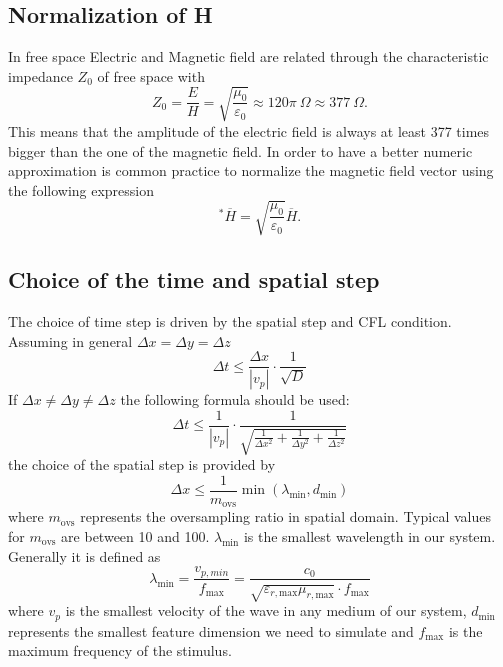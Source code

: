 \subsection{Normalization of H}
In free space Electric and Magnetic field are related through the characteristic impedance $Z_0$ of free space with
\begin{equation*}
	Z_0 = \frac{E}{H}=\sqrt{\frac{\mu_0}{\varepsilon_0}} \approx 120\pi~\Omega \approx 377~\Omega.
\end{equation*}
This means that the amplitude of the electric field is always at least 377 times bigger than the one of the magnetic field. In order to have a better numeric approximation is common practice to normalize the magnetic field vector using the following expression
\begin{equation*}
	^*\overline{H} = \sqrt{\frac{\mu_0}{\varepsilon_0}} \overline{H}.
\end{equation*}

\subsection{Choice of the time and spatial step}
\label{sec:steps}
The choice of time step is driven by the spatial step and CFL condition. Assuming in general  $\Delta x = \Delta y = \Delta z$ 
\begin{equation*}
	\Delta t \leq \frac{\Delta x}{|v_p|} \cdot \frac{1}{\sqrt{D}}
\end{equation*}
If $\Delta x \neq \Delta y \neq \Delta z$ the following formula should be used:
\begin{equation*}
	\Delta t \leq \frac{1}{|v_p|} \cdot \frac{1}{\sqrt{\frac{1}{\Delta x^2}+\frac{1}{\Delta y^2}+\frac{1}{\Delta z^2}}}
\end{equation*}
the choice of the spatial step is provided by 
\begin{equation*}
	\Delta x \leq \frac{1}{m_\textrm{ovs}} \min (\lambda_\textrm{min},d_\textrm{min})
\end{equation*}
where $m_\textrm{ovs}$ represents the oversampling ratio in spatial domain. Typical values for $m_\textrm{ovs}$ are between 10 and 100. $\lambda_\textrm{min}$ is the smallest wavelength in our system. Generally it is defined as 
\begin{equation*}
	\lambda_\textrm{min} = \frac{v_{p,min}}{f_\textrm{max}} = \frac{c_0}{\sqrt{\varepsilon_{r,\textrm{max}}\mu_{r,\textrm{max}}}\cdot f_\textrm{max} }
\end{equation*}
where $v_p$ is the smallest velocity of the wave in any medium of our system, $d_\textrm{min}$ represents the smallest feature dimension we need to simulate and $f_\textrm{max}$ is the maximum frequency of the stimulus.

